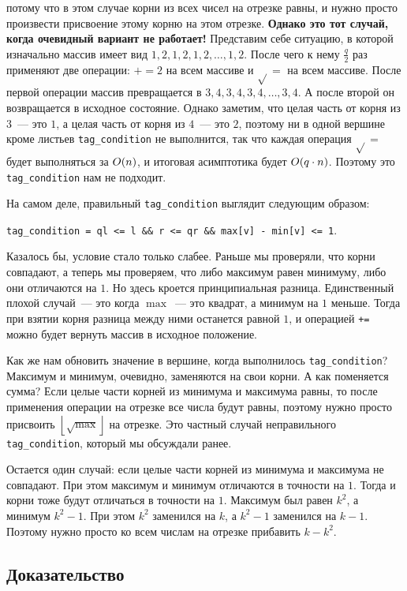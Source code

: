 потому что в этом случае корни из всех чисел на отрезке равны, и нужно просто произвести присвоение этому корню на этом отрезке. \textbf{Однако это тот случай, когда очевидный вариант не работает!} Представим себе ситуацию, в которой изначально массив имеет вид $1, 2, 1, 2, 1, 2, \ldots, 1, 2$. После чего к нему $\frac{q}{2}$ раз применяют две операции: $+=2$ на всем массиве и $\sqrt{}=$ на всем массиве.
После первой операции массив превращается в $3, 4, 3, 4, 3, 4, \ldots, 3, 4$. А после второй он возвращается в исходное состояние.
Однако заметим, что целая часть от корня из $3$~--- это $1$, а целая часть от корня из $4$~--- это $2$, поэтому ни в одной вершине кроме листьев \verb+tag_condition+ не выполнится, так что каждая операция $\sqrt{}=$ будет выполняться за $O(n)$, и итоговая асимптотика будет $O(q \cdot n)$. Поэтому это \verb+tag_condition+ нам не подходит.

На самом деле, правильный \verb+tag_condition+ выглядит следующим образом:

\verb+tag_condition = ql <= l && r <= qr && max[v] - min[v] <= 1+.

Казалось бы, условие стало только слабее. Раньше мы проверяли, что корни совпадают, а теперь мы проверяем, что либо максимум равен минимуму, либо они отличаются на $1$. Но здесь кроется принципиальная разница. Единственный плохой случай~--- это когда $\max$~--- это квадрат, а минимум на $1$ меньше. Тогда при взятии корня разница между ними останется равной $1$, и операцией \verb^+=^ можно будет вернуть массив в исходное положение.

Как же нам обновить значение в вершине, когда выполнилось \verb+tag_condition+? Максимум и минимум, очевидно, заменяются на свои корни.
А как поменяется сумма? Если целые части корней из минимума и максимума равны, то после применения операции на отрезке все числа будут равны, поэтому нужно просто присвоить $\left\lfloor \sqrt{\max} \right\rfloor$ на отрезке. Это частный случай неправильного \verb+tag_condition+, который мы обсуждали ранее.

Остается один случай: если целые части корней из минимума и максимума не совпадают. При этом максимум и минимум отличаются в точности на $1$. Тогда и корни тоже будут отличаться в точности на $1$. Максимум был равен $k^2$, а минимум $k^2 - 1$. При этом $k^2$ заменился на $k$, а $k^2 - 1$ заменился на $k - 1$. Поэтому нужно просто ко всем числам на отрезке прибавить $k - k^2$.


\subsection{Доказательство}

